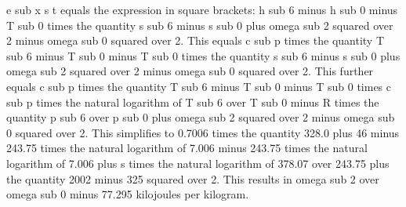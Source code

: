 e sub x s t equals the expression in square brackets: h sub 6 minus h sub 0 minus T sub 0 times the quantity s sub 6 minus s sub 0 plus omega sub 2 squared over 2 minus omega sub 0 squared over 2. This equals c sub p times the quantity T sub 6 minus T sub 0 minus T sub 0 times the quantity s sub 6 minus s sub 0 plus omega sub 2 squared over 2 minus omega sub 0 squared over 2. This further equals c sub p times the quantity T sub 6 minus T sub 0 minus T sub 0 times c sub p times the natural logarithm of T sub 6 over T sub 0 minus R times the quantity p sub 6 over p sub 0 plus omega sub 2 squared over 2 minus omega sub 0 squared over 2. This simplifies to 0.7006 times the quantity 328.0 plus 46 minus 243.75 times the natural logarithm of 7.006 minus 243.75 times the natural logarithm of 7.006 plus s times the natural logarithm of 378.07 over 243.75 plus the quantity 2002 minus 325 squared over 2. This results in omega sub 2 over omega sub 0 minus 77.295 kilojoules per kilogram.